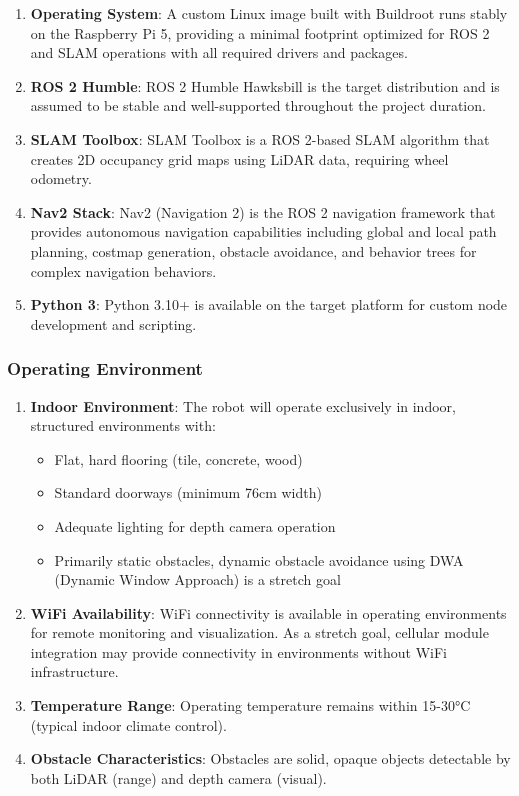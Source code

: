 \begin{enumerate}
    \item \textbf{Operating System}: A custom Linux image built with Buildroot runs stably on the Raspberry Pi 5, providing a minimal footprint optimized for ROS 2 and SLAM operations with all required drivers and packages.

    \item \textbf{ROS 2 Humble}: ROS 2 Humble Hawksbill is the target distribution and is assumed to be stable and well-supported throughout the project duration.

    \item \textbf{SLAM Toolbox}: SLAM Toolbox is a ROS 2-based SLAM algorithm that creates 2D occupancy grid maps using LiDAR data, requiring wheel odometry.

    \item \textbf{Nav2 Stack}: Nav2 (Navigation 2) is the ROS 2 navigation framework that provides autonomous navigation capabilities including global and local path planning, costmap generation, obstacle avoidance, and behavior trees for complex navigation behaviors.

    \item \textbf{Python 3}: Python 3.10+ is available on the target platform for custom node development and scripting.
\end{enumerate}

\subsubsection{Operating Environment}

\begin{enumerate}
    \item \textbf{Indoor Environment}: The robot will operate exclusively in indoor, structured environments with:
    \begin{itemize}
        \item Flat, hard flooring (tile, concrete, wood)
        \item Standard doorways (minimum 76cm width)
        \item Adequate lighting for depth camera operation
        \item Primarily static obstacles, dynamic obstacle avoidance using DWA (Dynamic Window Approach) is a stretch goal
    \end{itemize}

    \item \textbf{WiFi Availability}: WiFi connectivity is available in operating environments for remote monitoring and visualization. As a stretch goal, cellular module integration may provide connectivity in environments without WiFi infrastructure.

    \item \textbf{Temperature Range}: Operating temperature remains within 15-30°C (typical indoor climate control).

    \item \textbf{Obstacle Characteristics}: Obstacles are solid, opaque objects detectable by both LiDAR (range) and depth camera (visual).
\end{enumerate}

